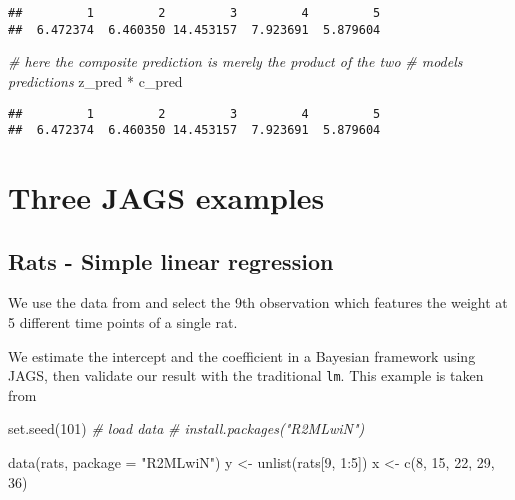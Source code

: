 \documentclass[
  oneside]{book}
\newenvironment{Shaded}{\begin{snugshade}}{\end{snugshade}}
\newcommand{\AttributeTok}[1]{\textcolor[rgb]{0.77,0.63,0.00}{#1}}
\newcommand{\CommentTok}[1]{\textcolor[rgb]{0.56,0.35,0.01}{\textit{#1}}}
\newcommand{\DecValTok}[1]{\textcolor[rgb]{0.00,0.00,0.81}{#1}}
\newcommand{\FunctionTok}[1]{\textcolor[rgb]{0.00,0.00,0.00}{#1}}
\newcommand{\NormalTok}[1]{#1}
\newcommand{\OtherTok}[1]{\textcolor[rgb]{0.56,0.35,0.01}{#1}}
\newcommand{\SpecialCharTok}[1]{\textcolor[rgb]{0.00,0.00,0.00}{#1}}
\newcommand{\StringTok}[1]{\textcolor[rgb]{0.31,0.60,0.02}{#1}}
\begin{document}
\begin{verbatim}
##         1         2         3         4         5 
##  6.472374  6.460350 14.453157  7.923691  5.879604
\end{verbatim}

\begin{Shaded}
\begin{Highlighting}[]
\CommentTok{\# here the composite prediction is merely the product of the two}
\CommentTok{\# models predictions}
\NormalTok{z\_pred }\SpecialCharTok{*}\NormalTok{ c\_pred}
\end{Highlighting}
\end{Shaded}

\begin{verbatim}
##         1         2         3         4         5 
##  6.472374  6.460350 14.453157  7.923691  5.879604
\end{verbatim}

\hypertarget{three-jags-examples}{%
\chapter{Three JAGS examples}\label{three-jags-examples}}

\hypertarget{rats---simple-linear-regression}{%
\section{Rats - Simple linear regression}\label{rats---simple-linear-regression}}

We use the data from \citep{rats} and select the 9th
observation which features the weight at 5 different
time points of a single rat.

We estimate the intercept and the coefficient
in a Bayesian framework using JAGS,
then validate our result with the traditional \texttt{lm}.
This example is taken from \citep{bugs}

\begin{Shaded}
\begin{Highlighting}[]
\FunctionTok{set.seed}\NormalTok{(}\DecValTok{101}\NormalTok{)}
\CommentTok{\# load data}
\CommentTok{\# install.packages("R2MLwiN")}

\FunctionTok{data}\NormalTok{(rats, }\AttributeTok{package =} \StringTok{"R2MLwiN"}\NormalTok{)}
\NormalTok{y }\OtherTok{\textless{}{-}} \FunctionTok{unlist}\NormalTok{(rats[}\DecValTok{9}\NormalTok{, }\DecValTok{1}\SpecialCharTok{:}\DecValTok{5}\NormalTok{])}
\NormalTok{x }\OtherTok{\textless{}{-}} \FunctionTok{c}\NormalTok{(}\DecValTok{8}\NormalTok{, }\DecValTok{15}\NormalTok{, }\DecValTok{22}\NormalTok{, }\DecValTok{29}\NormalTok{, }\DecValTok{36}\NormalTok{)}
\end{Highlighting}
\end{Shaded}
\end{document}

